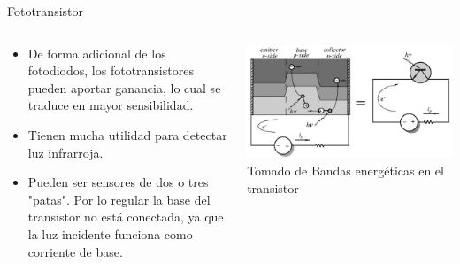 \documentclass[aspectratio=169]{beamer}
\begin{document}
\begin{frame}{Fototransistor}
    \begin{columns}[onlytextwidth]
        \begin{column}{0.55\textwidth}
            \begin{itemize}
                \item De forma adicional de los fotodiodos, los fototransistores pueden aportar ganancia, lo cual se traduce en mayor sensibilidad. 
                \item Tienen mucha utilidad para detectar luz infrarroja. 
                \item Pueden ser sensores de dos o tres "patas". Por lo regular la base del transistor no está conectada, ya que la luz incidente funciona como corriente de base.
            \end{itemize}
        \end{column}
        \begin{column}{0.45\textwidth}
            \centering
            \includegraphics[width = 0.9\linewidth]{fig/Optica/fototransistor.PNG}
            \tiny{Tomado de \cite{Fraden_2016}}
            \tiny{Bandas energéticas en el transistor}
        \end{column}
    \end{columns}
\end{frame}
\end{document}
